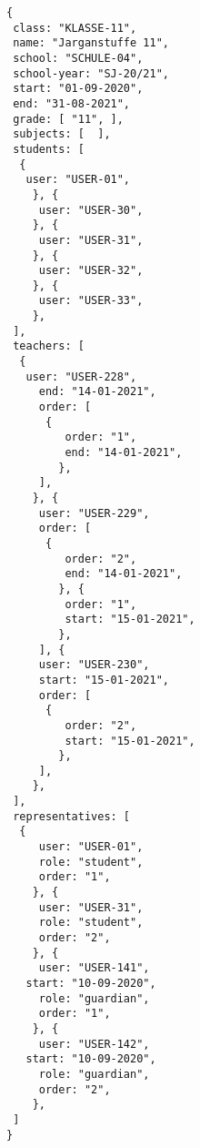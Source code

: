 
\begin{lstlisting}[caption={Klassen Datenmodel Beispiel 2: Jagangstuffe 11, Seundarstuffe 2},frame=tlrb]
{
 class: "KLASSE-11",
 name: "Jarganstuffe 11",
 school: "SCHULE-04",
 school-year: "SJ-20/21",
 start: "01-09-2020",
 end: "31-08-2021",
 grade: [ "11", ],
 subjects: [  ],
 students: [
  { 
   user: "USER-01",
	}, { 
	 user: "USER-30",
	}, { 
	 user: "USER-31",
	}, { 
	 user: "USER-32",
	}, { 
	 user: "USER-33",
	},
 ],
 teachers: [
  { 
   user: "USER-228",
	 end: "14-01-2021",
	 order: [
	  {
		 order: "1",
		 end: "14-01-2021",
		},
	 ],
	}, { 
	 user: "USER-229",
	 order: [
	  {
		 order: "2",
		 end: "14-01-2021",
		}, {
		 order: "1",
		 start: "15-01-2021",
		},
	 ], { 
	 user: "USER-230",
	 start: "15-01-2021",
	 order: [
	  {
		 order: "2",
		 start: "15-01-2021",
		},
	 ],
	},
 ],
 representatives: [
  {
	 user: "USER-01",
	 role: "student",
	 order: "1",	 
	}, {
	 user: "USER-31",
	 role: "student",
	 order: "2",	 
	}, {
	 user: "USER-141",
   start: "10-09-2020",
	 role: "guardian",
	 order: "1",	 
	}, {
	 user: "USER-142",
   start: "10-09-2020",
	 role: "guardian",
	 order: "2",	 
	},  
 ]
}
\end{lstlisting}